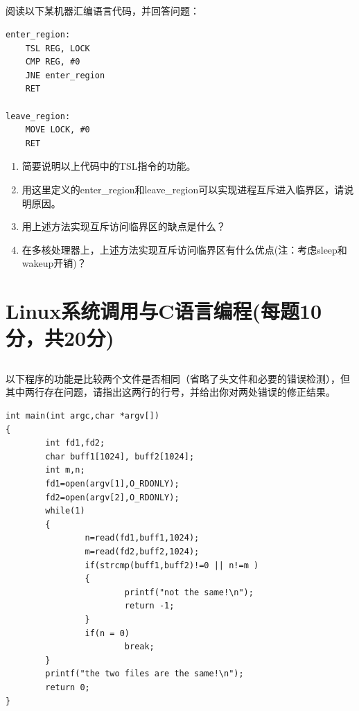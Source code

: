 \documentclass[a4paper,11pt]{article}
\begin{document}
\begin{CJK*}{UTF8}{gbsn}
\newpage
\subsection{}
阅读以下某机器汇编语言代码，并回答问题：

%
\begin{verbatim}
enter_region:
    TSL REG, LOCK
    CMP REG, #0
    JNE enter_region
    RET

leave_region:
    MOVE LOCK, #0
    RET
\end{verbatim}
\begin{enumerate}
\item 简要说明以上代码中的TSL指令的功能。
\item 用这里定义的enter\_region和leave\_region可以实现进程互斥进入临界区，请说明原因。
\item 用上述方法实现互斥访问临界区的缺点是什么？
\item 在多核处理器上，上述方法实现互斥访问临界区有什么优点(注：考虑sleep和wakeup开销)？
\end{enumerate}

\newpage
\section{Linux系统调用与C语言编程(每题10分，共20分)}

\subsection{}
以下程序的功能是比较两个文件是否相同（省略了头文件和必要的错误检测），但其中两行存在问题，请指出这两行的行号，并给出你对两处错误的修正结果。
%
\begin{verbatim}
int main(int argc,char *argv[])
{
        int fd1,fd2;
        char buff1[1024], buff2[1024];
        int m,n;
        fd1=open(argv[1],O_RDONLY);
        fd2=open(argv[2],O_RDONLY);
        while(1)
        {       
                n=read(fd1,buff1,1024);   
                m=read(fd2,buff2,1024);
                if(strcmp(buff1,buff2)!=0 || n!=m )
                {
                        printf("not the same!\n");
                        return -1;           
                }
                if(n = 0)
                        break;          
        }
        printf("the two files are the same!\n");
        return 0;
}
\end{verbatim}

\newpage

\end{CJK*}
\end{document}
